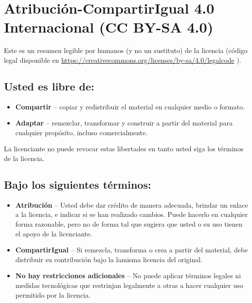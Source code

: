 \chapter*{Atribución-CompartirIgual 4.0 Internacional (CC BY-SA 4.0)}

Este es un resumen legible por humanos (y no un sustituto) de la
licencia (código legal disponible en
\url{https://creativecommons.org/licenses/by-sa/4.0/legalcode}
).

\section*{Usted es libre de:}

\begin{itemize}

\item \textbf{Compartir} --
copiar y redistribuir el material en cualquier medio o formato.

\item \textbf{Adaptar} -- 
remezclar, transformar y construir a partir del material
para cualquier propósito, incluso comercialmente.

\end{itemize}

La licenciante no puede revocar estas libertades en tanto usted siga los
términos de la licencia.

\section*{Bajo los siguientes términos:}

\begin{itemize}

\item \ccAttribution \quad \textbf{Atribución} --
Usted debe dar crédito de manera adecuada, brindar un enlace a la licencia, e
indicar si se han realizado cambios. Puede hacerlo en cualquier forma
razonable, pero no de forma tal que sugiera que usted o su uso tienen el apoyo
de la licenciante. 

\item \ccShareAlike \quad \textbf{CompartirIgual} --
Si remezcla, transforma o crea a partir del material, debe distribuir su
contribución bajo la lamisma licencia del original. 

\item \textbf{No hay restricciones adicionales} -- 
No puede aplicar términos legales ni medidas tecnológicas que restrinjan
legalmente a otras a hacer cualquier uso permitido por la licencia. 

\end{itemize}

